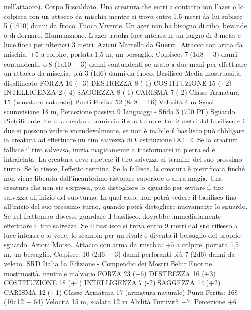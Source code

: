 \begin{multicols}{2}
nell’attacco).
Corpo Riscaldato. Una creatura che entri a contatto con l’azer o
lo colpisca con un attacco da mischia mentre si trova entro 1,5
metri da lui subisce 5 (1d10) danni da fuoco.
Fuoco Vivente. Un azer non ha bisogno di cibo, bevande o di
dormire.
Illuminazione. L’azer irradia luce intensa in un raggio di 3 metri
e luce fioca per ulteriori 3 metri.
Azioni
Martello da Guerra. Attacco con arma da mischia: +5 a colpire,
portata 1,5 m, un bersaglio.
Colpisce: 7 (1d8 + 3) danni contundenti, o 8 (1d10 + 3) danni
contundenti se usato a due mani per effettuare un attacco da
mischia, più 3 (1d6) danni da fuoco.
Basilisco
Media mostruosità, disallineato
FORZA 16 (+3)
DESTREZZA 8 (-1)
COSTITUZIONE 15 (+2)
INTELLIGENZA 2 (-4)
SAGGEZZA 8 (-1)
CARISMA 7 (-2)
Classe Armatura 15 (armatura naturale)
\hspace*{0pt}\hfill{Punti Ferita}: 52 (8d8 + 16)
Velocità 6 m
Sensi scurovisione 18 m, Percezione passiva 9
Linguaggi -
Sfida 3 (700 PE)
Sguardo Pietrificante. Se una creatura comincia il suo turno entro 9
metri dal basilisco e i due si possono vedere vicendevolmente, se non
è inabile il basilisco può obbligare la creatura ad effettuare un tiro
salvezza di Costituzione DC 12. Se la creatura fallisce il tiro
salvezza, inizia magicamente a trasformarsi in pietra ed è intralciata.
La creatura deve ripetere il tiro salvezza al termine del suo prossimo
turno. Se lo riesce, l’effetto termina. Se lo fallisce, la creatura è
pietrificata finché non viene liberata dall’incantesimo ristorare
superiore o altra magia.
Una creatura che non sia sorpresa, può distogliere lo sguardo per
evitare il tiro salvezza all’inizio del suo turno. In quel caso, non
potrà vedere il basilisco fino all’inizio del suo prossimo turno,
quando potrà distogliere nuovamente lo sguardo. Se nel
frattempo dovesse guardare il basilisco, dovrebbe
immediatamente effettuare il tiro salvezza.
Se il basilisco si trova entro 9 metri dal suo riflesso a luce intensa
e lo vede, lo scambia per un rivale e diventa il bersaglio del
proprio sguardo.
Azioni
Morso. Attacco con arma da mischia: +5 a colpire, portata 1,5
m, un bersaglio.
Colpisce: 10 (2d6 + 3) danni perforanti più 7 (2d6) danni da veleno.
SRD Italia 5a Edizione - Compendio dei Mostri
Behir
Enorme mostruosità, neutrale malvagio
FORZA 23 (+6)
DESTREZZA 16 (+3)
COSTITUZIONE 18 (+4)
INTELLIGENZA 7 (-2)
SAGGEZZA 14 (+2)
CARISMA 12 (+1)
Classe Armatura 17 (armatura naturale)
\hspace*{0pt}\hfill{Punti Ferita}: 168 (16d12 + 64)
Velocità 15 m, scalata 12 m
Abilità Furtività +7, Percezione +6

\end{multicols}
